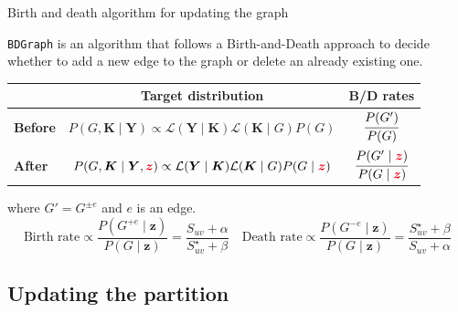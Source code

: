 \begin{frame}{Birth and death algorithm for updating the graph}

    \texttt{BDGraph} is an algorithm that follows a Birth-and-Death approach to decide whether to \alert{add} a new edge to the graph or \alert{delete} an already existing one.

    \pause
    
    \begin{table}[tb]
        \centering
        \begin{tabular}{lcc}
        \toprule
        & Target distribution & B/D rates \\
        \hline
        \textbf{Before} & $P(G,\bm{K} \mid \bm{Y}) \propto \mathcal{L}(\bm{Y} \mid \bm{K})\mathcal{L} (\bm{K} \mid {G})P(G)$ & $\cfrac{P(G')}{P(G)}$ \\
        \textbf{After}  & $P(G,\bm{K} \mid \bm{Y}, \textcolor{sleekRed}{\bm{z}}) \propto \mathcal{L}(\bm{Y} \mid \bm{K})\mathcal{L}(\bm{K} \mid {G})P(G \mid \textcolor{sleekRed}{\bm{z}})$ & $\cfrac{P(G' \mid \textcolor{sleekRed}{\bm{z}})}{P(G \mid \textcolor{sleekRed}{\bm{z}})}$ \\
        \bottomrule
        \end{tabular}
    \end{table}
    where $G' = G^{\pm e}$ and $e$ is an edge.
    \pause
    \[
        \text{Birth rate} \propto \frac{P(G^{+ e}\mid \bm{z})}{P(G\mid \bm{z})} = \frac{S_{uv} + \alpha}{S^{\star}_{uv} + \beta}
        \quad
        \text{Death rate} \propto \frac{P(G^{- e}\mid \bm{z})}{P(G\mid \bm{z})} = \frac{S^{\star}_{uv} + \beta}{S_{uv} + \alpha}
    \]
    
\end{frame}

\subsection{Updating the partition}

